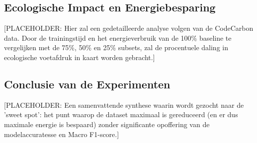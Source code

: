 \subsection{Ecologische Impact en Energiebesparing}
[PLACEHOLDER: Hier zal een gedetailleerde analyse volgen van de CodeCarbon data. Door de trainingstijd en het energieverbruik van de 100\% baseline te vergelijken met de 75\%, 50\% en 25\% subsets, zal de procentuele daling in ecologische voetafdruk in kaart worden gebracht.]

\subsection{Conclusie van de Experimenten}
[PLACEHOLDER: Een samenvattende synthese waarin wordt gezocht naar de 'sweet spot': het punt waarop de dataset maximaal is gereduceerd (en er dus maximale energie is bespaard) zonder significante opoffering van de modelaccuratesse en Macro F1-score.]